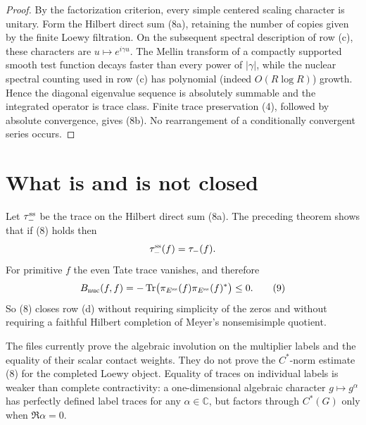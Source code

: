 \documentclass[11pt]{article}
\begin{document}
\begin{proof}
By the factorization criterion, every simple centered scaling character is
unitary.  Form the Hilbert direct sum (8a), retaining the number of copies
given by the finite Loewy filtration.  On the subsequent spectral
description of row (c), these characters are $u\mapsto e^{i\gamma u}$.
The Mellin transform of a compactly supported smooth test function decays
faster than every power of $|\gamma|$, while the nuclear spectral counting
used in row (c) has polynomial (indeed $O(R\log R)$) growth.  Hence the
diagonal eigenvalue sequence is absolutely summable and the integrated
operator is trace class.  Finite trace preservation (4), followed by
absolute convergence, gives (8b).  No rearrangement of a conditionally
convergent series occurs.
\end{proof}

\section{What is and is not closed}

Let $\tau_-^{\rm ss}$ be the trace on the Hilbert direct sum (8a).  The
preceding theorem shows that if (8) holds then
\[
 \tau_-^{\rm ss}(f)=\tau_-(f).
\]
For primitive $f$ the even Tate trace vanishes, and therefore
\begin{equation}
 B_{\rm nuc}(f,f)
 =-\operatorname{Tr}\bigl(\pi_{E^{\rm ss}}(f)
                  \pi_{E^{\rm ss}}(f)^*\bigr)\le0.  \tag{9}
\end{equation}
So (8) closes row (d) without requiring simplicity of the zeros and without
requiring a faithful Hilbert completion of Meyer's nonsemisimple quotient.

The files currently prove the algebraic involution on the multiplier
labels and the equality of their scalar contact weights.  They do not prove
the $C^*$-norm estimate (8) for the completed Loewy object.  Equality of
traces on individual labels is weaker than complete contractivity: a
one-dimensional algebraic character $g\mapsto g^\alpha$ has perfectly
defined label traces for any $\alpha\in\mathbb C$, but factors through
$C^*(G)$ only when $\Re\alpha=0$.
\end{document}
